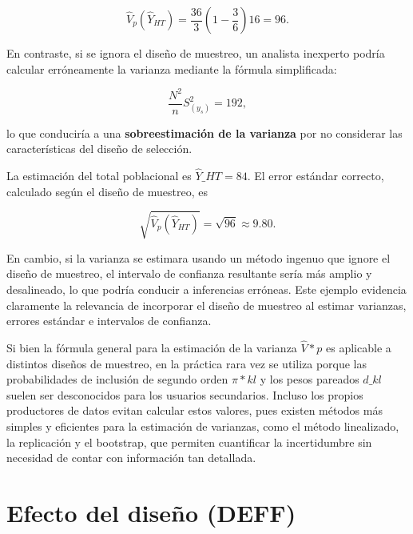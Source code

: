 \documentclass[
  spanish,
  12pt,
]{book}
\begin{document}
\[
\hat{V}_p(\hat{Y}_{HT}) = \frac{36}{3}\left(1-\frac{3}{6}\right)16 = 96.
\]

En contraste, si se ignora el diseño de muestreo, un analista inexperto podría calcular erróneamente la varianza mediante la fórmula simplificada:

\[
\frac{N^2}{n}S_{(y_s)}^2 = 192,
\]

lo que conduciría a una \textbf{sobreestimación de la varianza} por no considerar las características del diseño de selección.

La estimación del total poblacional es \(\hat{Y}\_{HT}=84\). El error estándar correcto, calculado según el diseño de muestreo, es

\[
\sqrt{\hat{V}_p(\hat{Y}_{HT})} = \sqrt{96} \approx 9.80.
\]

En cambio, si la varianza se estimara usando un método ingenuo que ignore el diseño de muestreo, el intervalo de confianza resultante sería más amplio y desalineado, lo que podría conducir a inferencias erróneas. Este ejemplo evidencia claramente la relevancia de incorporar el diseño de muestreo al estimar varianzas, errores estándar e intervalos de confianza.

Si bien la fórmula general para la estimación de la varianza \(\hat{V}*p\) es aplicable a distintos diseños de muestreo, en la práctica rara vez se utiliza porque las probabilidades de inclusión de segundo orden \(\pi*{kl}\) y los pesos pareados \(d\_{kl}\) suelen ser desconocidos para los usuarios secundarios. Incluso los propios productores de datos evitan calcular estos valores, pues existen métodos más simples y eficientes para la estimación de varianzas, como el método linealizado, la replicación y el bootstrap, que permiten cuantificar la incertidumbre sin necesidad de contar con información tan detallada.

\section{Efecto del diseño (DEFF)}\label{efecto-del-diseuxf1o-deff}
\end{document}
